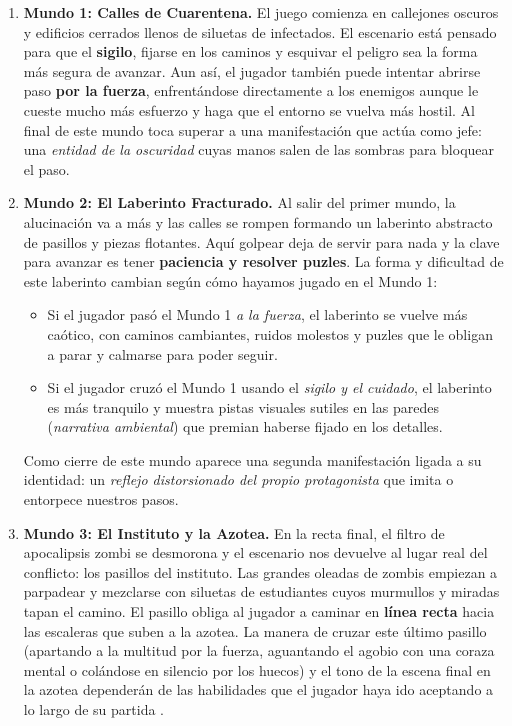 \begin{enumerate}
  \item \textbf{Mundo 1: Calles de Cuarentena.} El juego comienza en callejones oscuros y edificios cerrados llenos de siluetas de infectados. El escenario está pensado para que el \textbf{sigilo}, fijarse en los caminos y esquivar el peligro sea la forma más segura de avanzar. Aun así, el jugador también puede intentar abrirse paso \textbf{por la fuerza}, enfrentándose directamente a los enemigos aunque le cueste mucho más esfuerzo y haga que el entorno se vuelva más hostil. Al final de este mundo toca superar a una manifestación que actúa como jefe: una \textit{entidad de la oscuridad} cuyas manos salen de las sombras para bloquear el paso.

  \item \textbf{Mundo 2: El Laberinto Fracturado.} Al salir del primer mundo, la alucinación va a más y las calles se rompen formando un laberinto abstracto de pasillos y piezas flotantes. Aquí golpear deja de servir para nada y la clave para avanzar es tener \textbf{paciencia y resolver puzles}. La forma y dificultad de este laberinto cambian según cómo hayamos jugado en el Mundo 1:
  \begin{itemize}
    \item Si el jugador pasó el Mundo 1 \textit{a la fuerza}, el laberinto se vuelve más caótico, con caminos cambiantes, ruidos molestos y puzles que le obligan a parar y calmarse para poder seguir.
    \item Si el jugador cruzó el Mundo 1 usando el \textit{sigilo y el cuidado}, el laberinto es más tranquilo y muestra pistas visuales sutiles en las paredes (\textit{narrativa ambiental}) que premian haberse fijado en los detalles.
  \end{itemize}
  Como cierre de este mundo aparece una segunda manifestación ligada a su identidad: un \textit{reflejo distorsionado del propio protagonista} que imita o entorpece nuestros pasos.

  \item \textbf{Mundo 3: El Instituto y la Azotea.} En la recta final, el filtro de apocalipsis zombi se desmorona y el escenario nos devuelve al lugar real del conflicto: los pasillos del instituto. Las grandes oleadas de zombis empiezan a parpadear y mezclarse con siluetas de estudiantes cuyos murmullos y miradas tapan el camino. El pasillo obliga al jugador a caminar en \textbf{línea recta} hacia las escaleras que suben a la azotea. La manera de cruzar este último pasillo (apartando a la multitud por la fuerza, aguantando el agobio con una coraza mental o colándose en silencio por los huecos) y el tono de la escena final en la azotea dependerán de las habilidades que el jugador haya ido aceptando a lo largo de su partida \parencite{gomez2026, hernandez2024}.
\end{enumerate}

